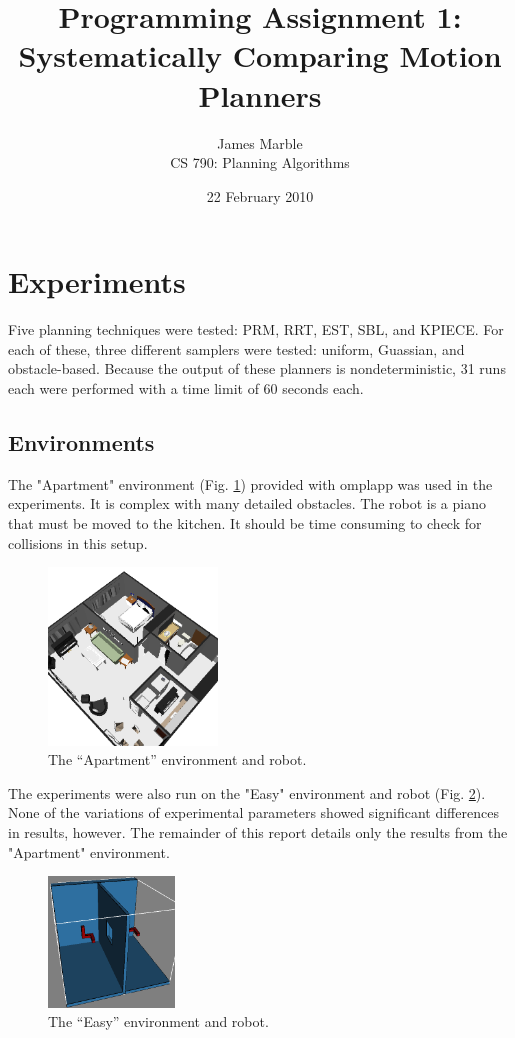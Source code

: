 \documentclass[twocolumn]{article}
\title{Programming Assignment 1:\\
       Systematically Comparing Motion Planners}
\author{James Marble \\   
        CS 790: Planning Algorithms}
\date{22 February 2010}
\begin{document}
\maketitle

\section{Experiments}

Five planning techniques were tested: PRM, RRT, EST, SBL, and KPIECE. For each of these, three different samplers were tested: uniform, Guassian, and obstacle-based. Because the output of these planners is nondeterministic, 31 runs each were performed with a time limit of 60 seconds each.

\subsection{Environments}

The "Apartment" environment (Fig. \ref{fig:apartment}) provided with omplapp was used in the experiments.  It is complex with many detailed obstacles. The robot is a piano that must be moved to the kitchen. It should be time consuming to check for collisions in this setup.

\begin{figure}
  \centering
    \includegraphics[width=0.4\textwidth]{Apartment}
  \caption{The ``Apartment'' environment and robot.}
  \label{fig:apartment}
\end{figure}

The experiments were also run on the "Easy" environment and robot (Fig. \ref{fig:easy}). None of the variations of experimental parameters showed significant differences in results, however. The remainder of this report details only the results from the "Apartment" environment.

\begin{figure}
  \centering
    \includegraphics[width=0.3\textwidth]{Easy}
  \caption{The ``Easy'' environment and robot.}
  \label{fig:easy}
\end{figure}
\end{document}
